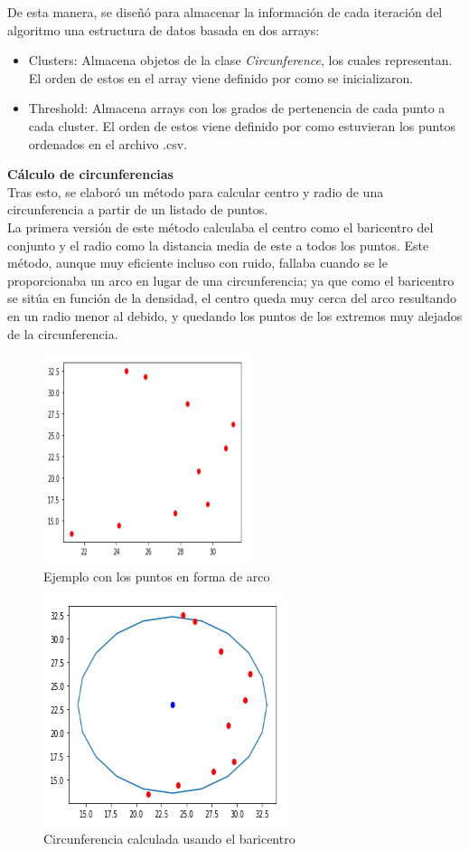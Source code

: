 \documentclass[conference,a4paper]{IEEEtran}
\begin{document}
De esta manera, se diseñó para almacenar la información de cada iteración del algoritmo una estructura de datos basada en dos arrays: 
\begin{itemize}
	\item Clusters: Almacena objetos de la clase \textit{Circunference}, los cuales representan. El orden de estos en el array viene definido por como se inicializaron.
	\item Threshold: Almacena arrays con los grados de pertenencia de cada punto a cada cluster. El orden de estos viene definido por como estuvieran los puntos ordenados en el archivo .csv.\\
\end{itemize}

\textbf{Cálculo de circunferencias}\\

Tras esto, se elaboró un método para calcular centro y radio de una circunferencia a partir de un listado de puntos.\\ 
La primera versión de este método calculaba el centro como el baricentro del conjunto y el radio como la distancia media de este a todos los puntos. Este método, aunque muy eficiente incluso con ruido, fallaba cuando se le proporcionaba un arco en lugar de una circunferencia; ya que como el baricentro se sitúa en función de la densidad, el centro queda muy cerca del arco resultando en un radio menor al debido, y quedando los puntos de los extremos muy alejados de la circunferencia.\\

\newpage
\begin{figure}[h]
\centering
\includegraphics[scale=0.9]{ArcoBaricentro}
\caption{Ejemplo con los puntos en forma de arco}
\end{figure}

\begin{figure}[h]
\centering
\includegraphics[scale=0.8]{ArcoBaricentroResultado}
\caption{Circunferencia calculada usando el baricentro}
\end{figure}
\end{document}
